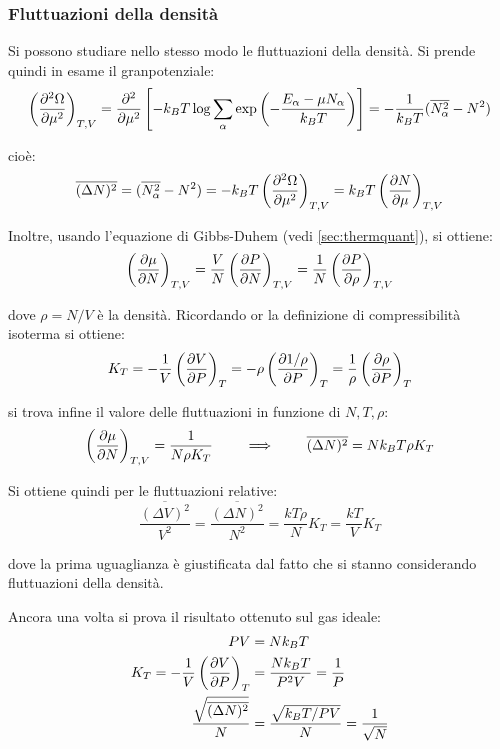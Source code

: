 \subsubsection{Fluttuazioni della densità}
Si possono studiare nello stesso modo le fluttuazioni della densità. Si prende quindi in esame il granpotenziale:
\begin{equation*}
\left(\frac{\partial {^2 \Omega}}{\partial {\mu^2}}\right)_{T,V} = \frac{\partial {^2}}{\partial {\mu^2}} \left[ -k_B T \log \sum_{\alpha} \exp \left(- \frac{E_\alpha - \mu N_\alpha}{k_B T}\right)\right] = - \frac{1}{k_B T} (\overline{N_\alpha^2} - N^2)
\end{equation*}

\noindent cioè:
\begin{equation*}
\overline{(\Delta N)^2} = (\overline{N_\alpha^2} - N^2) = - k_B T \left(\frac{\partial {^2 \Omega}}{\partial {\mu^2}}\right)_{T,V} = k_B T \left(\frac{\partial {N}}{\partial {\mu}}\right)_{T,V}
\end{equation*}

Inoltre, usando l'equazione di Gibbs-Duhem (vedi \cref{sec:thermquant}), si ottiene:
\begin{equation*}
\left(\frac{\partial {\mu}}{\partial {N}}\right)_{T,V} = \frac{V}{N} \left(\frac{\partial {P}}{\partial {N}}\right)_{T,V} = \frac{1}{N} \left(\frac{\partial {P}}{\partial {\rho}}\right)_{T,V}
\end{equation*}

\noindent dove $\rho = N/V$ è la densità. Ricordando or la definizione di compressibilità isoterma si ottiene:
\begin{equation*}
	K_T = - \frac{1}{V} \left(\frac{\partial {V}}{\partial {P}}\right)_{T} = - \rho \left(\frac{\partial {1/\rho}}{\partial {P}}\right)_{T} = \frac{1}{\rho} \left(\frac{\partial {\rho}}{\partial {P}}\right)_{T}
\end{equation*}

\noindent si trova infine il valore delle fluttuazioni in funzione di $N,T,\rho$:
\begin{equation*}
	\left(\frac{\partial {\mu}}{\partial {N}}\right)_{T,V} = \frac{1}{N \rho K_T} \qquad \implies \qquad \overline{(\Delta N)^2} = N k_B T \rho K_T
\end{equation*}

Si ottiene quindi per le fluttuazioni relative:
\begin{equation*}
	\frac{\overline{(\Delta V)^2}}{V^2} = \frac{\overline{(\Delta N)^2}}{N^2} = \frac{kT\rho}{N} K_T = \frac{kT}{V} K_T
\end{equation*}

\noindent dove la prima uguaglianza è giustificata dal fatto che si stanno considerando fluttuazioni della densità.

Ancora una volta si prova il risultato ottenuto sul gas ideale:
\begin{align*}
PV &= Nk_B T\\
K_T = - \frac{1}{V} \left(\frac{\partial {V}}{\partial {P}}\right)_{T} &= \frac{N k_B T}{P^2 V} = \frac{1}{P}\\
\frac{\sqrt{\overline{(\Delta N)^2}}}{N} &= \frac{\sqrt{k_B T / PV}}{N} = \frac{1}{\sqrt{N}}
\end{align*}

